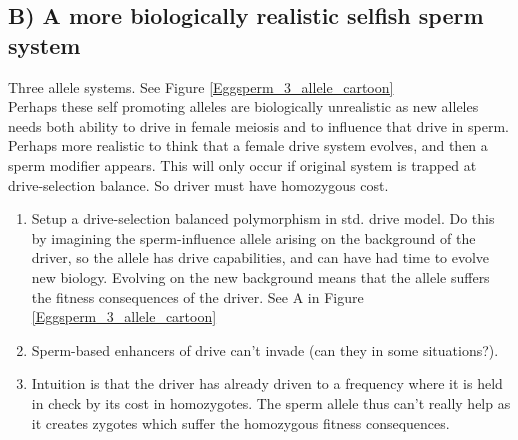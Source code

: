 \documentclass[12pt,letterpaper]{article}
\begin{document}
\subsection*{B) A more biologically realistic selfish sperm system}
Three allele systems. See Figure \ref{Eggsperm_3_allele_cartoon} \\ 
Perhaps these self promoting alleles are biologically unrealistic as new alleles needs 
both ability to drive in female meiosis and to influence that drive in sperm.
Perhaps more realistic to think that a female drive system evolves, 
and then a sperm modifier appears. This will only occur if original system is trapped 
at drive-selection balance. So driver must have homozygous cost.

\begin{enumerate}
\item Setup a drive-selection balanced polymorphism in std. drive model. 
Do this by imagining the sperm-influence allele arising on the background of the driver, 
so the allele has drive capabilities, and can have had time to evolve new biology. 
Evolving on the new background means that the allele suffers the fitness consequences of the 
driver.  See A in Figure \ref{Eggsperm_3_allele_cartoon} \\
\item Sperm-based enhancers of drive can't invade (can they in some situations?). \\
\item Intuition is that the driver has already driven to a frequency 
where it is held in check by its cost in homozygotes. The sperm allele 
thus can't really help as it creates zygotes which suffer the homozygous fitness consequences.
\end{enumerate}
\end{document}
